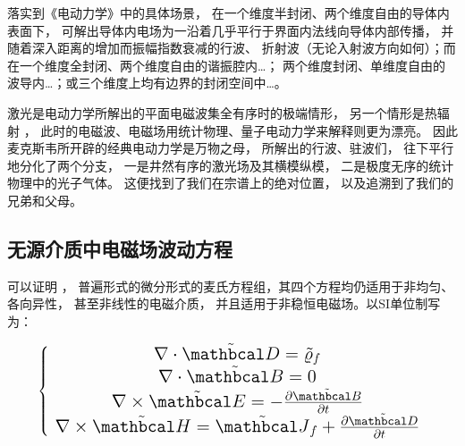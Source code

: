 落实到《电动力学》中的具体场景， 在一个维度半封闭、两个维度自由的导体内表面下，
可解出导体内电场为一沿着几乎平行于界面内法线向导体内部传播， 并随着深入距离的增加而振幅指数衰减的行波、
折射波（无论入射波方向如何）；而在一个维度全封闭、两个维度自由的谐振腔内\dots；
两个维度封闭、单维度自由的波导内\dots；或三个维度上均有边界的封闭空间中\dots。

激光是电动力学所解出的平面电磁波集全有序时的极端情形， 另一个情形是热辐射
， 此时的电磁波、电磁场用统计物理、量子电动力学来解释则更为漂亮。
因此麦克斯韦所开辟的经典电动力学是万物之母， 所解出的行波、驻波们，
往下平行地分化了两个分支， 一是井然有序的激光场及其横模纵模， 二是极度无序的统计物理中的光子气体。
这便找到了我们在宗谱上的绝对位置， 以及追溯到了我们的兄弟和父母。

\subsection{无源介质中电磁场波动方程}

可以证明 
， 普遍形式的微分形式的麦氏方程组，其四个方程均仍适用于非均匀、各向异性， 甚至非线性的电磁介质， 
并且适用于非稳恒电磁场。以SI单位制写为：


\begin{theorem}
	\begin{equation}\Large
		\left\{ {\begin{array}{*{20}{c}}
			{\nabla  \cdot \tilde {\mathbcal D} = {{\tilde \varrho }_f}}\\
			{\nabla  \cdot \tilde {\mathbcal B} = 0}\\
			{\nabla  \times \tilde {\mathbcal E} =  - \frac{{\partial \tilde {\mathbcal B}}}{{\partial t}}}\\
			{\nabla  \times \tilde {\mathbcal H} = {{\tilde {\mathbcal J}}_f} + \frac{{\partial \tilde {\mathbcal D}}}{{\partial t}}}
			\end{array}} \right.
	\end{equation}
\end{theorem}

